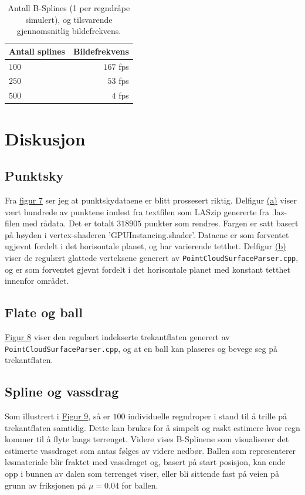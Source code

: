 \documentclass[norsk, doc, 11pt, a4paper]{apa7}  %
\begin{document}
\begin{table}[H] \label{tab:fps}
	\centering
	\begin{tabular}{|l|r|}
		\hline
		Antall splines & Bildefrekvens \\\hline
		\(100\) & \(167\) fps \\\hline
		\(250\) & \(53\) fps \\\hline
		\(500\) & \(4\) fps \\\hline
	\end{tabular}
	\caption{Antall B-Splines (1 per regndråpe simulert), og tilsvarende gjennomsnitlig bildefrekvens.}
\end{table}

\section{Diskusjon}
\subsection{Punktsky}
Fra  \hyperref[fig:punkt]{figur 7} ser jeg at punktskydataene er blitt prossesert riktig. Delfigur \hyperref[fig:punkt]{(a)} viser vært hundrede av punktene innlest fra textfilen som LASzip genererte fra .laz-filen med rådata. Det er totalt \(318905\) punkter som rendres. Fargen er satt basert på høyden i vertex-shaderen 'GPUInstancing.shader'. Dataene er som forventet ugjevnt fordelt i det horisontale planet, og har varierende tetthet.  Delfigur \hyperref[fig:punkt]{(b)} viser de regulært glattede verteksene generert av \verb+PointCloudSurfaceParser.cpp+, og er som forventet gjevnt fordelt i det horisontale planet med konstant tetthet innenfor området.

\subsection{Flate og ball}
\hyperref[fig:ball]{Figur 8} viser den regulært indekserte trekantflaten generert av \verb+PointCloudSurfaceParser.cpp+, og at en ball kan plaseres og bevege seg på trekantflaten.

\subsection{Spline og vassdrag}
Som illustrert i \hyperref[fig:regn]{Figur 9}, så er \(100\) individuelle regndroper i stand til å trille på trekantflaten samtidig. Dette kan brukes for å simpelt og raskt estimere hvor regn kommer til å flyte langs terrenget. Videre vises B-Splinene som visualiserer det estimerte vassdraget som antas følges av videre nedbør. Ballen som representerer løsmateriale blir fraktet med vassdraget og, basert på start posisjon, kan ende opp i bunnen av dalen som terrenget viser, eller bli sittende fast på veien på grunn av friksjonen på \(\mu = 0.04\) for ballen.
\end{document}
